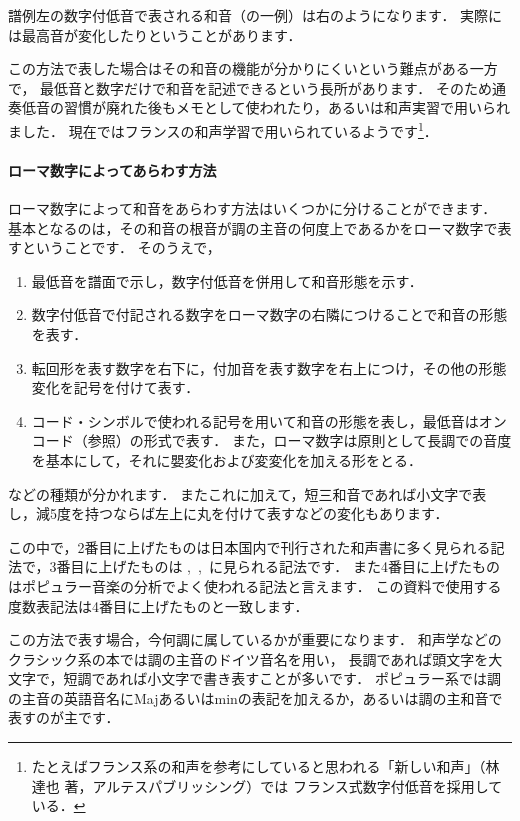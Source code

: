 \documentclass[dvipdfmx,uplatex,b5paper,openany,jbase=12Q,nomag*,textwidth-limit=44%
               ]{gachimuchi}[2020/05/05]
\begin{document}
譜例左の数字付低音で表される和音（の一例）は右のようになります．
実際には最高音が変化したりということがあります．

この方法で表した場合はその和音の機能が分かりにくいという難点がある一方で，
最低音と数字だけで和音を記述できるという長所があります．
そのため通奏低音の習慣が廃れた後もメモとして使われたり，あるいは和声実習で用いられました．
現在ではフランスの和声学習で用いられているようです\footnote{%
たとえばフランス系の和声を参考にしていると思われる「新しい和声」（林 達也 著，アルテスパブリッシング）では
フランス式数字付低音を採用している．}．

\paragraph{ローマ数字によってあらわす方法}
ローマ数字によって和音をあらわす方法はいくつかに分けることができます．
基本となるのは，その和音の根音が調の主音の何度上であるかをローマ数字で表すということです．
そのうえで，
\begin{enumerate}
  \item 最低音を譜面で示し，数字付低音を併用して和音形態を示す．
  \item 数字付低音で付記される数字をローマ数字の右隣につけることで和音の形態を表す．
  \item 転回形を表す数字を右下に，付加音を表す数字を右上につけ，その他の形態変化を記号を付けて表す．
  \item コード・シンボルで使われる記号を用いて和音の形態を表し，最低音はオンコード（参照）の形式で表す．
        また，ローマ数字は原則として長調での音度を基本にして，それに嬰変化および変変化を加える形をとる．
\end{enumerate}
などの種類が分かれます．
またこれに加えて，短三和音であれば小文字で表し，減5度を持つならば左上に丸を付けて表すなどの変化もあります．

この中で，2番目に上げたものは日本国内で刊行された和声書に多く見られる記法で，3番目に上げたものは
,\ \cite{chSHIMAOKA1ii},\ \cite{chSHIMAOKA1iii}に見られる記法です．
また4番目に上げたものはポピュラー音楽の分析でよく使われる記法と言えます．
この資料で使用する度数表記法は4番目に上げたものと一致します．

この方法で表す場合，今何調に属しているかが重要になります．
和声学などのクラシック系の本では調の主音のドイツ音名を用い，
長調であれば頭文字を大文字で，短調であれば小文字で書き表すことが多いです．
ポピュラー系では調の主音の英語音名にMajあるいはminの表記を加えるか，あるいは調の主和音で表すのが主です．
\end{document}

